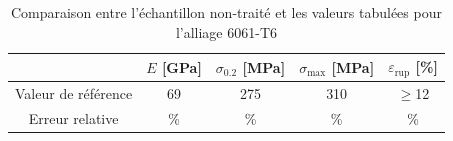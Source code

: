 \begin{table}[h]
    \centering
    \begin{tabular}{ |c||c|c|c|c| }
        \cline{2-5}
        \multicolumn{1}{c|}{} & \(E\) [GPa] & \(\sigma_{0.2}\) [MPa] & \(\sigma_{\textrm{max}}\) [MPa] & \(\varepsilon_{\textrm{rup}}\) [\%] \\
        \hline
        \multirow{1}{4cm}{Valeur de référence}
        & 69 & 275 & 310 & \(\ge\)12 \\
        \hline
        \multirow{1}{4cm}{Erreur relative}
        & \% & \% & \% & \% \\
        \hline
    \end{tabular}
    \caption{Comparaison entre l'échantillon non-traité et les valeurs tabulées pour l'alliage 6061-T6 \cite{alualualu}}
    \label{tab:err_rel}
\end{table}

